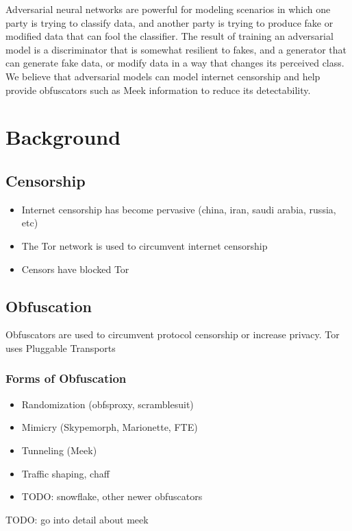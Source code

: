Adversarial neural networks are powerful for modeling scenarios in which one party is trying to classify data, and another party is trying to produce fake or modified data that can fool the classifier. The result of training an adversarial model is a discriminator that is somewhat resilient to fakes, and a generator that can generate fake data, or modify data in a way that changes its perceived class. We believe that adversarial models can model internet censorship and help provide obfuscators such as Meek information to reduce its detectability.
\nocite{*}


\section{Background}

\subsection{Censorship}
\begin{itemize}
    \item Internet censorship has become pervasive (china, iran, saudi arabia, russia, etc)
    \item The Tor network is used to circumvent internet censorship
    \item Censors have blocked Tor
\end{itemize}
\subsection{Obfuscation}
Obfuscators are used to circumvent protocol censorship or increase privacy. Tor uses Pluggable Transports
\subsubsection{Forms of Obfuscation}

\begin{itemize}
    \item Randomization (obfsproxy, scramblesuit)
    \item Mimicry (Skypemorph, Marionette, FTE)
    \item Tunneling (Meek)
    \item Traffic shaping, chaff
    \item TODO: snowflake, other newer obfuscators
\end{itemize}
TODO: go into detail about meek

